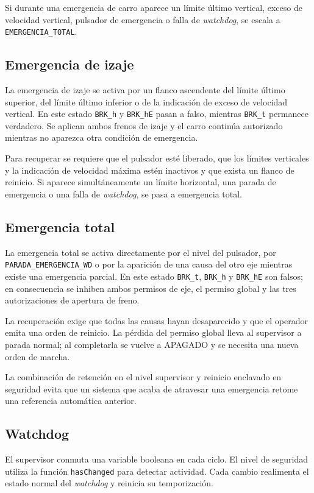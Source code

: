 \documentclass[a4paper,10pt,onecolumn,journal]{ieeeconf}
\numberwithin{equation}{section}
\begin{document}
Si durante una emergencia de carro aparece un límite último vertical, exceso de velocidad vertical, pulsador de emergencia o falla de \textit{watchdog}, se escala a \texttt{EMERGENCIA\_TOTAL}.


\subsection{Emergencia de izaje}
La emergencia de izaje se activa por un flanco ascendente del límite último superior, del límite último inferior o de la indicación de exceso de velocidad vertical. En este estado \texttt{BRK\_h} y \texttt{BRK\_hE} pasan a falso, mientras \texttt{BRK\_t} permanece verdadero. Se aplican ambos frenos de izaje y el carro continúa autorizado mientras no aparezca otra condición de emergencia.

Para recuperar se requiere que el pulsador esté liberado, que los límites verticales y la indicación de velocidad máxima estén inactivos y que exista un flanco de reinicio. Si aparece simultáneamente un límite horizontal, una parada de emergencia o una falla de \textit{watchdog}, se pasa a emergencia total.


\subsection{Emergencia total}
La emergencia total se activa directamente por el nivel del pulsador, por \texttt{PARADA\_EMERGENCIA\_WD} o por la aparición de una causa del otro eje mientras existe una emergencia parcial. En este estado \texttt{BRK\_t}, \texttt{BRK\_h} y \texttt{BRK\_hE} son falsos; en consecuencia se inhiben ambos permisos de eje, el permiso global y las tres autorizaciones de apertura de freno.

La recuperación exige que todas las causas hayan desaparecido y que el operador emita una orden de reinicio. La pérdida del permiso global lleva al supervisor a parada normal; al completarla se vuelve a APAGADO y se necesita una nueva orden de marcha.

La combinación de retención en el nivel supervisor y reinicio enclavado en seguridad evita que un sistema que acaba de atravesar una emergencia retome una referencia automática anterior.


\subsection{Watchdog}
El supervisor conmuta una variable booleana en cada ciclo. El nivel de seguridad utiliza la función \texttt{hasChanged} para detectar actividad. Cada cambio realimenta el estado normal del \textit{watchdog} y reinicia su temporización.
\end{document}
